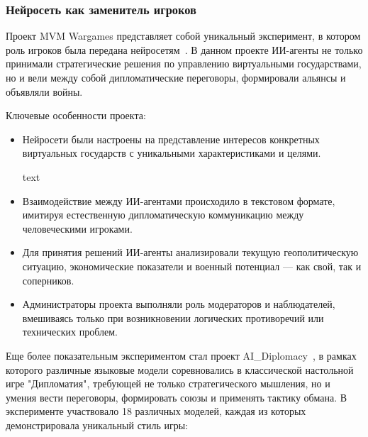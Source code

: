 \subsubsection{Нейросеть как заменитель игроков}

Проект MVM Wargames представляет собой уникальный эксперимент, в котором роль игроков была передана нейросетям~\cite{mvmwargames}. В данном проекте ИИ-агенты не только принимали стратегические решения по управлению виртуальными государствами, но и вели между собой дипломатические переговоры, формировали альянсы и объявляли войны.

Ключевые особенности проекта:

\begin{itemize}
\item Нейросети были настроены на представление интересов конкретных виртуальных государств с уникальными характеристиками и целями.

text
\item Взаимодействие между ИИ-агентами происходило в текстовом формате, имитируя естественную дипломатическую коммуникацию между человеческими игроками.

\item Для принятия решений ИИ-агенты анализировали текущую геополитическую ситуацию, экономические показатели и военный потенциал — как свой, так и соперников.

\item Администраторы проекта выполняли роль модераторов и наблюдателей, вмешиваясь только при возникновении логических противоречий или технических проблем.
\end{itemize}

Еще более показательным экспериментом стал проект AI_Diplomacy~\cite{ai_diplomacy}, в рамках которого различные языковые модели соревновались в классической настольной игре "Дипломатия", требующей не только стратегического мышления, но и умения вести переговоры, формировать союзы и применять тактику обмана. В эксперименте участвовало 18 различных моделей, каждая из которых демонстрировала уникальный стиль игры:

